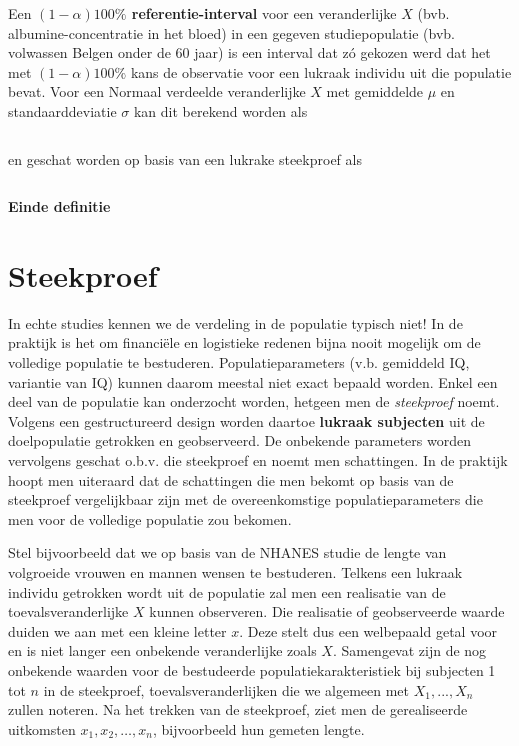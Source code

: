 \documentclass[
  12pt,dutch]{book}
\theoremstyle{definition}
\theoremstyle{definition}
\theoremstyle{definition}
\theoremstyle{definition}
\theoremstyle{remark}
\begin{document}
Een \textbf{\((1-\alpha)100\%\) referentie-interval}
voor een veranderlijke \(X\) (bvb. albumine-concentratie
in het bloed) in een gegeven studiepopulatie (bvb. volwassen Belgen onder de
60 jaar) is een interval dat zó gekozen werd dat het met \((1-\alpha)100\%\)
kans de observatie voor een lukraak individu uit die populatie bevat. Voor
een Normaal verdeelde veranderlijke \(X\) met gemiddelde \(\mu\) en
standaarddeviatie \(\sigma\) kan dit berekend worden als

\begin{equation*}
[\mu-z_{\alpha/2}\sigma,\mu+z_{\alpha/2}\sigma]
\end{equation*}

en geschat worden op basis van een lukrake steekproef als

\begin{equation*}
[\bar x-z_{\alpha/2}s_x,\bar x+z_{\alpha/2}s_x]
\end{equation*}

\textbf{Einde definitie}

\section{Steekproef}\label{steekproef}

In echte studies kennen we de verdeling in de populatie typisch niet!
In de praktijk is het om financiële en logistieke redenen bijna nooit mogelijk om de
volledige populatie te bestuderen. Populatieparameters (v.b. gemiddeld IQ, variantie van IQ) kunnen daarom meestal
niet exact bepaald worden. Enkel een deel van de populatie kan onderzocht
worden, hetgeen men de \emph{steekproef} noemt. Volgens een
gestructureerd design worden daartoe \textbf{lukraak subjecten} uit de doelpopulatie
getrokken en geobserveerd. De onbekende parameters worden vervolgens geschat
o.b.v. die steekproef en noemt men schattingen. In de praktijk hoopt men uiteraard dat de schattingen die men bekomt op basis van de steekproef vergelijkbaar zijn met de overeenkomstige populatieparameters die men voor de volledige populatie zou bekomen.

Stel bijvoorbeeld dat we op basis van de NHANES studie de lengte van volgroeide vrouwen en mannen wensen te bestuderen.
Telkens een lukraak individu getrokken wordt uit de populatie zal men een
realisatie van de toevalsveranderlijke \(X\) kunnen observeren. Die realisatie
of geobserveerde waarde duiden we aan met een kleine letter \(x\). Deze stelt
dus een welbepaald getal voor en is niet langer een onbekende veranderlijke
zoals \(X\). Samengevat zijn de nog onbekende waarden voor de
bestudeerde populatiekarakteristiek bij subjecten 1 tot \(n\) in de
steekproef, toevalsveranderlijken die we algemeen met \(X_1,...,X_n\)
zullen noteren. Na het trekken van de steekproef, ziet men de gerealiseerde
uitkomsten \(x_1, x_2, \dots, x_n\), bijvoorbeeld hun gemeten lengte.
\end{document}
